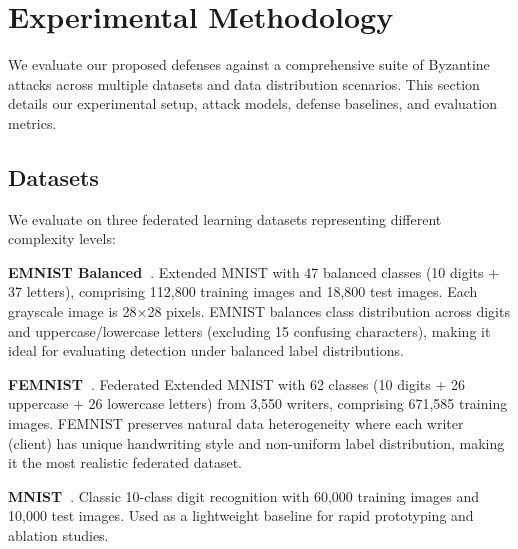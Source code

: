 %
%

\section{Experimental Methodology}
\label{sec:methods}

We evaluate our proposed defenses against a comprehensive suite of Byzantine attacks across multiple datasets and data distribution scenarios. This section details our experimental setup, attack models, defense baselines, and evaluation metrics.


\subsection{Datasets}
\label{sec:datasets}

We evaluate on three federated learning datasets representing different complexity levels:

\textbf{EMNIST Balanced~\cite{cohen2017emnist}}. Extended MNIST with 47 balanced classes (10 digits + 37 letters), comprising 112,800 training images and 18,800 test images. Each grayscale image is 28×28 pixels. EMNIST balances class distribution across digits and uppercase/lowercase letters (excluding 15 confusing characters), making it ideal for evaluating detection under balanced label distributions.

\textbf{FEMNIST~\cite{caldas2018leaf}}. Federated Extended MNIST with 62 classes (10 digits + 26 uppercase + 26 lowercase letters) from 3,550 writers, comprising 671,585 training images. FEMNIST preserves natural data heterogeneity where each writer (client) has unique handwriting style and non-uniform label distribution, making it the most realistic federated dataset.

\textbf{MNIST~\cite{lecun1998mnist}}. Classic 10-class digit recognition with 60,000 training images and 10,000 test images. Used as a lightweight baseline for rapid prototyping and ablation studies.

